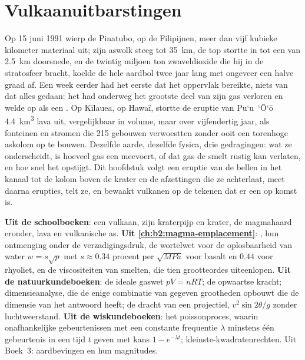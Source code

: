 \chapter{Vulkaanuitbarstingen}\label{ch:b2:eruptive-styles}

Op 15 juni 1991 wierp de Pinatubo, op de Filipijnen, meer dan vijf
kubieke kilometer materiaal uit; zijn aswolk steeg tot
\qty{35}{km}, de top stortte in tot een  van \qty{2.5}{km} doorsnede, en de
twintig miljoen ton zwaveldioxide die hij in de stratosfeer bracht, koelde de
hele aardbol twee jaar lang met ongeveer een halve graad af. Een week eerder had het eerste
 dat het oppervlak bereikte, niets van dat alles gedaan: het had onderweg het grootste deel van zijn
gas verloren en welde op als een . Op Kīlauea, op Hawaï, stortte de
eruptie van Pu`u~`\=O`\=o \qty{4.4}{km^3} lava uit, vergelijkbaar in volume,
maar over vijfendertig jaar, als fonteinen en stromen die 215 gebouwen verwoestten
zonder ooit een torenhoge askolom op te bouwen. Dezelfde aarde, dezelfde fysica, drie gedragingen: wat
ze onderscheidt, is hoeveel gas een  meevoert, of dat gas de
smelt rustig kan verlaten, en hoe snel het  opstijgt. Dit hoofdstuk volgt een eruptie
van de bellen in het kanaal tot de kolom boven de krater en de afzettingen die ze
achterlaat, meet daarna erupties, telt ze, en bewaakt vulkanen op de
tekenen dat er een op komst is.

\begin{recall}
\textbf{Uit de schoolboeken}: een vulkaan, zijn kraterpijp en krater, de
magmahaard eronder, lava en vulkanische as. \textbf{Uit
\cref{ch:b2:magma-emplacement}}: , hun ontmenging onder de
verzadigingsdruk, de wortelwet voor de oplosbaarheid van water $w = s\sqrt p$ met
$s \approx 0.34$ procent per $\sqrt{\unit{MPa}}$ voor basalt en $0.44$ voor
rhyoliet, en de viscositeiten van smelten, die tien grootteordes uiteenlopen.
\textbf{Uit de natuurkundeboeken}: de ideale gaswet $pV = nRT$; de opwaartse kracht;
dimensieanalyse, die de enige combinatie van gegeven grootheden opbouwt
die de dimensie van het antwoord heeft; de dracht van een projectiel, $v^2\sin 2\theta/g$
zonder luchtweerstand. \textbf{Uit de wiskundeboeken}: het poissonproces,
waarin onafhankelijke gebeurtenissen met een constante frequentie $\lambda$ minstens één gebeurtenis
in een tijd $t$ geven met kans $1 - e^{-\lambda t}$; kleinste-kwadratenrechten.
Uit Boek~3: aardbevingen en hun magnitudes.
\end{recall}

